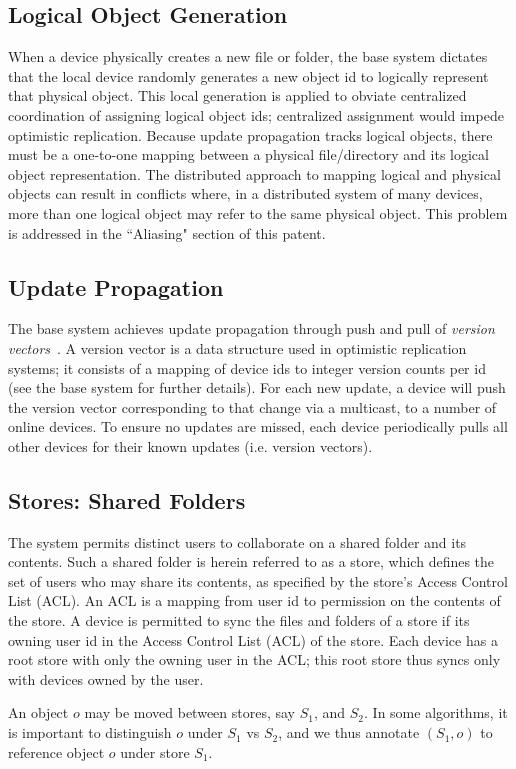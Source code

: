 \subsection*{Logical Object Generation}

When a device physically creates a new file or folder, the base system dictates
that the local device randomly generates a new object id to logically represent
that physical object. This local generation is applied to obviate centralized
coordination of assigning logical object ids; centralized assignment would
impede optimistic replication. Because update propagation tracks logical
objects, there must be a one-to-one mapping between a physical file/directory
and its logical object representation. The distributed approach to mapping
logical and physical objects can result in conflicts where, in a distributed
system of many devices, more than one logical object may refer to the same
physical object. This problem is addressed in the ``Aliasing" section of this
patent.

\subsection*{Update Propagation}

The base system achieves update propagation through push and pull of {\em
version vectors}~\cite{wang:patent2012, parker:dmi1983}. A version vector is a
data structure used in optimistic replication systems; it consists of a mapping
of device ids to integer version counts per id (see the base system for further
details). For each new update, a device will push the version vector
corresponding to that change via a multicast, to a number of online devices. To
ensure no updates are missed, each device periodically pulls all other devices
for their known updates (i.e. version vectors).

\subsection*{Stores: Shared Folders}

The system permits distinct users to collaborate on a shared folder and its
contents. Such a shared folder is herein referred to as a store, which defines
the set of users who may share its contents, as specified by the store's Access
Control List (ACL). An ACL is a mapping from user id to permission on the
contents of the store. A device is permitted to sync the files and folders of a
store if its owning user id in the Access Control List (ACL) of the store.
Each device has a root store with only the owning user in the ACL; this root
store thus syncs only with devices owned by the user.

An object $o$ may be moved between stores, say $S_1$, and $S_2$. In some
algorithms, it is important to distinguish $o$ under $S_1$ vs $S_2$, and we thus
annotate $(S_1, o)$ to reference object $o$ under store $S_1$.
